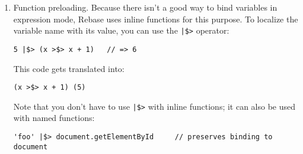 \documentclass{report}
\begin{document}
\begin{enumerate}
\begin{verbatim}
var f = x >$> x + 1;
var g = y >$> y << 5;
\end{verbatim}

          Anything at or below a relational operator, however, must be parenthesized:

\begin{verbatim}
var f = (x, y) >$> (x !== y);
var g = (x, y, z) >$> (x ? y : z);
\end{verbatim}

          Unfortunately, JavaScript won't let you define a nullary function as \verb|() >$> x|. However, you can bind a throwaway variable such as \verb|_| and use that instead:
          \verb|_ >$> x|. Since JavaScript doesn't track formal parameters anyway, there isn't much difference.

          Note that this macro transforms expressions of the form \verb|args >$> expression| into \verb|(function (args) {return expression})|. This has some important consequences, perhaps
          foremost that \verb|this| and \verb|arguments| take on different meanings on the right-hand side of \verb|>$>|. So, for example, this function will not do what seems obvious:

\begin{verbatim}
String.prototype['*'] = f >$> (
  this.split('').map(x >$> f(x, this)));
\end{verbatim}

          The inner \verb|this| that gets passed to \verb|f| will be \verb|[object global]|, not the original string.

\item Function preloading. Because there isn't a good way to bind variables in expression mode, Rebase uses inline functions for this purpose. To localize the variable name with its value,
          you can use the \verb+|$>+ operator:

\begin{verbatim}
5 |$> (x >$> x + 1)   // => 6
\end{verbatim}

          This code gets translated into:

\begin{verbatim}
(x >$> x + 1) (5)
\end{verbatim}

          Note that you don't have to use \verb+|$>+ with inline functions; it can also be used with named functions:

\begin{verbatim}
'foo' |$> document.getElementById     // preserves binding to document
\end{verbatim}


\end{enumerate}
\end{document}
